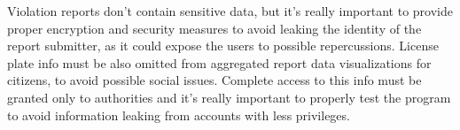 Violation reports don't contain sensitive data, but it's really important to provide proper encryption and security measures to avoid leaking the identity of the report submitter, as it could expose the users to possible repercussions. License plate info must be also omitted from aggregated report data visualizations for citizens, to  avoid possible social issues. Complete access to this info must be granted only to authorities and it's really important to properly test the program to avoid information leaking from accounts with less privileges.